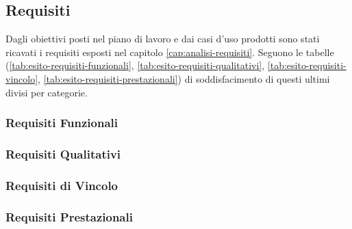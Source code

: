\subsection{Requisiti}
Dagli obiettivi posti nel piano di lavoro e dai casi d'uso prodotti sono stati ricavati i requisiti esposti nel capitolo \ref{cap:analisi-requisiti}. Seguono le tabelle (\ref{tab:esito-requisiti-funzionali}, \ref{tab:esito-requisiti-qualitativi}, \ref{tab:esito-requisiti-vincolo}, \ref{tab:esito-requisiti-prestazionali}) di soddisfacimento di questi ultimi divisi per categorie.

\newpage
\subsubsection{Requisiti Funzionali}

\newpage
\subsubsection{Requisiti Qualitativi}

\subsubsection{Requisiti di Vincolo}

\subsubsection{Requisiti Prestazionali}

